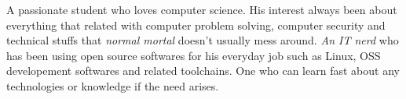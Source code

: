 

\begin{cvparagraph}

A passionate student who loves computer science. His interest always been about everything that related with computer problem solving, computer security and technical stuffs that \textit{normal mortal} doesn't usually mess around. \textit{An IT nerd} who has been using open source softwares for his everyday job such as Linux, OSS developement softwares and related toolchains. One who can learn fast about any technologies or knowledge if the need arises.
\end{cvparagraph}
